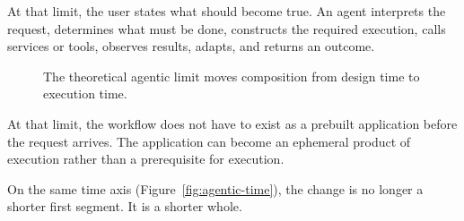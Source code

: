 \documentclass[10pt,oneside,openany]{book}
\begin{document}
At that limit, the user states what should become true. An agent interprets the request, determines what must be done, constructs the required execution, calls services or tools, observes results, adapts, and returns an outcome.

\begin{figure}[!htbp]
\centering
{}
\caption{The theoretical agentic limit moves composition from design time to execution time.}
\end{figure}

At that limit, the workflow does not have to exist as a prebuilt application before the request arrives. The application can become an ephemeral product of execution rather than a prerequisite for execution.

On the same time axis (Figure~\ref{fig:agentic-time}), the change is no longer a shorter first segment. It is a shorter whole.
\end{document}
